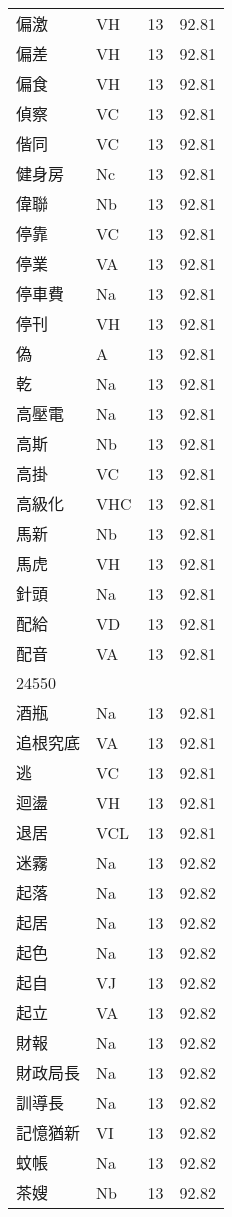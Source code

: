\documentclass[twocolumn]{book}
\begin{document}
\begin{supertabular}{llrr}
偏激 & VH & 13 &  92.81\\
偏差 & VH & 13 &  92.81\\
偏食 & VH & 13 &  92.81\\
偵察 & VC & 13 &  92.81\\
偕同 & VC & 13 &  92.81\\
健身房 & Nc & 13 &  92.81\\
偉聯 & Nb & 13 &  92.81\\
停靠 & VC & 13 &  92.81\\
停業 & VA & 13 &  92.81\\
停車費 & Na & 13 &  92.81\\
停刊 & VH & 13 &  92.81\\
偽 & A & 13 &  92.81\\
乾 & Na & 13 &  92.81\\
高壓電 & Na & 13 &  92.81\\
高斯 & Nb & 13 &  92.81\\
高掛 & VC & 13 &  92.81\\
高級化 & VHC & 13 &  92.81\\
馬新 & Nb & 13 &  92.81\\
馬虎 & VH & 13 &  92.81\\
針頭 & Na & 13 &  92.81\\
配給 & VD & 13 &  92.81\\
配音 & VA & 13 &  92.81\\
24550\\
酒瓶 & Na & 13 &  92.81\\
追根究底 & VA & 13 &  92.81\\
逃 & VC & 13 &  92.81\\
迴盪 & VH & 13 &  92.81\\
退居 & VCL & 13 &  92.81\\
迷霧 & Na & 13 &  92.82\\
起落 & Na & 13 &  92.82\\
起居 & Na & 13 &  92.82\\
起色 & Na & 13 &  92.82\\
起自 & VJ & 13 &  92.82\\
起立 & VA & 13 &  92.82\\
財報 & Na & 13 &  92.82\\
財政局長 & Na & 13 &  92.82\\
訓導長 & Na & 13 &  92.82\\
記憶猶新 & VI & 13 &  92.82\\
蚊帳 & Na & 13 &  92.82\\
茶嫂 & Nb & 13 &  92.82\\

\end{supertabular}
\end{document}
